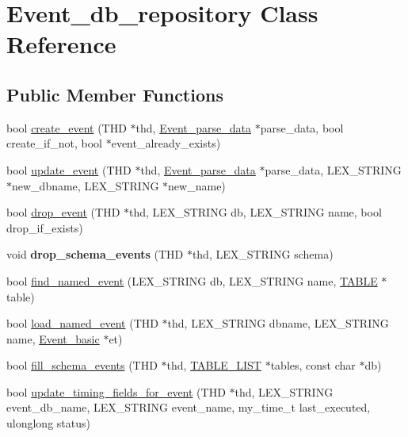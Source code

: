 \hypertarget{classEvent__db__repository}{}\section{Event\+\_\+db\+\_\+repository Class Reference}
\label{classEvent__db__repository}
\subsection*{Public Member Functions}
\begin{DoxyCompactItemize}
\item 
bool \mbox{\hyperlink{group__Event__Scheduler_gab5e75d43c08714c55b64116ab3e9eaed}{create\+\_\+event}} (T\+HD $\ast$thd, \mbox{\hyperlink{classEvent__parse__data}{Event\+\_\+parse\+\_\+data}} $\ast$parse\+\_\+data, bool create\+\_\+if\+\_\+not, bool $\ast$event\+\_\+already\+\_\+exists)
\item 
bool \mbox{\hyperlink{group__Event__Scheduler_ga2febaed952a7cc8253508b8ea0bc4516}{update\+\_\+event}} (T\+HD $\ast$thd, \mbox{\hyperlink{classEvent__parse__data}{Event\+\_\+parse\+\_\+data}} $\ast$parse\+\_\+data, L\+E\+X\+\_\+\+S\+T\+R\+I\+NG $\ast$new\+\_\+dbname, L\+E\+X\+\_\+\+S\+T\+R\+I\+NG $\ast$new\+\_\+name)
\item 
bool \mbox{\hyperlink{group__Event__Scheduler_ga70b022bf1055eb3251b9ff13c621e5c9}{drop\+\_\+event}} (T\+HD $\ast$thd, L\+E\+X\+\_\+\+S\+T\+R\+I\+NG db, L\+E\+X\+\_\+\+S\+T\+R\+I\+NG name, bool drop\+\_\+if\+\_\+exists)
\item 
void {\bfseries drop\+\_\+schema\+\_\+events} (T\+HD $\ast$thd, L\+E\+X\+\_\+\+S\+T\+R\+I\+NG schema)
\item 
bool \mbox{\hyperlink{group__Event__Scheduler_ga5ceeecadecac16417612be9384296bfd}{find\+\_\+named\+\_\+event}} (L\+E\+X\+\_\+\+S\+T\+R\+I\+NG db, L\+E\+X\+\_\+\+S\+T\+R\+I\+NG name, \mbox{\hyperlink{structTABLE}{T\+A\+B\+LE}} $\ast$table)
\item 
bool \mbox{\hyperlink{group__Event__Scheduler_ga12847ce2627dee3ddb5d0b28d3bc4ba7}{load\+\_\+named\+\_\+event}} (T\+HD $\ast$thd, L\+E\+X\+\_\+\+S\+T\+R\+I\+NG dbname, L\+E\+X\+\_\+\+S\+T\+R\+I\+NG name, \mbox{\hyperlink{classEvent__basic}{Event\+\_\+basic}} $\ast$et)
\item 
bool \mbox{\hyperlink{group__Event__Scheduler_ga6fa6828fbb74522072631b6d462b6772}{fill\+\_\+schema\+\_\+events}} (T\+HD $\ast$thd, \mbox{\hyperlink{structTABLE__LIST}{T\+A\+B\+L\+E\+\_\+\+L\+I\+ST}} $\ast$tables, const char $\ast$db)
\item 
bool \mbox{\hyperlink{group__Event__Scheduler_gaa06f66d76c295601f91ce2b9dc119909}{update\+\_\+timing\+\_\+fields\+\_\+for\+\_\+event}} (T\+HD $\ast$thd, L\+E\+X\+\_\+\+S\+T\+R\+I\+NG event\+\_\+db\+\_\+name, L\+E\+X\+\_\+\+S\+T\+R\+I\+NG event\+\_\+name, my\+\_\+time\+\_\+t last\+\_\+executed, ulonglong status)
\end{DoxyCompactItemize}
